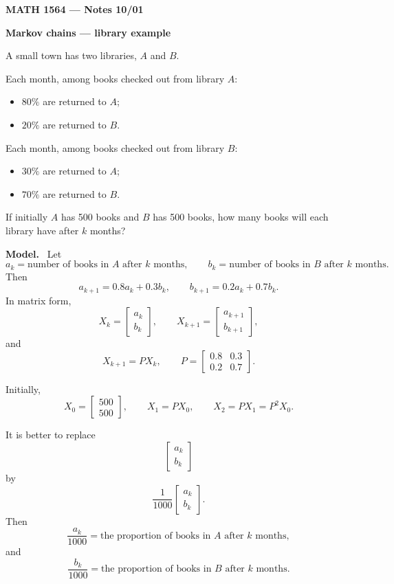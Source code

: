 \documentclass[letterpaper]{article}
\newcommand{\noteheader}[1]{\par\medskip\noindent\textbf{#1}\ }
\begin{document}
\textbf{MATH 1564 --- Notes 10/01}

\bigskip

\textbf{Markov chains --- library example}

\medskip

A small town has two libraries, $A$ and $B$.

Each month, among books checked out from library $A$:
\begin{itemize}
\item $80\%$ are returned to $A$;
\item $20\%$ are returned to $B$.
\end{itemize}

Each month, among books checked out from library $B$:
\begin{itemize}
\item $30\%$ are returned to $A$;
\item $70\%$ are returned to $B$.
\end{itemize}

If initially $A$ has 500 books and $B$ has 500 books, how many books will each library have after $k$ months?

\noteheader{Model.} Let
\[
a_k=\text{number of books in $A$ after $k$ months},
\qquad
b_k=\text{number of books in $B$ after $k$ months}.
\]
Then
\[
a_{k+1}=0.8a_k+0.3b_k,
\qquad
b_{k+1}=0.2a_k+0.7b_k.
\]
In matrix form,
\[
X_k=\begin{bmatrix}a_k\\b_k\end{bmatrix},
\qquad
X_{k+1}=\begin{bmatrix}a_{k+1}\\b_{k+1}\end{bmatrix},
\]
and
\[
X_{k+1}=PX_k,
\qquad
P=\begin{bmatrix}0.8&0.3\\0.2&0.7\end{bmatrix}.
\]

\clearpage

Initially,
\[
X_0=\begin{bmatrix}500\\500\end{bmatrix},
\qquad
X_1=PX_0,
\qquad
X_2=PX_1=P^2X_0.
\]

It is better to replace
\[
\begin{bmatrix}a_k\\b_k\end{bmatrix}
\]
by
\[
\frac{1}{1000}\begin{bmatrix}a_k\\b_k\end{bmatrix}.
\]
Then
\[
\frac{a_k}{1000}=\text{the proportion of books in $A$ after $k$ months},
\]
and
\[
\frac{b_k}{1000}=\text{the proportion of books in $B$ after $k$ months}.
\]
\end{document}
